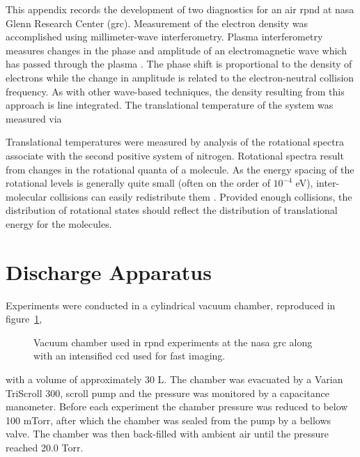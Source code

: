 This appendix records the development of two diagnostics for an air \acs{rpnd}
at \acs{nasa} Glenn Research Center (\acs{grc}). Measurement of the electron
density was accomplished using millimeter-wave interferometry. Plasma
interferometry measures changes in the phase and amplitude of an electromagnetic
wave which has passed through the plasma \cite{Lieberman2005}. The phase shift
is proportional to the density of electrons while the change in amplitude is
related to the electron-neutral collision frequency. As with other wave-based
techniques, the density resulting from this approach is line integrated. The
translational temperature of the system was measured via

Translational temperatures were measured by analysis of the rotational spectra
associate with the second positive system of nitrogen. Rotational spectra result
from changes in the rotational quanta of a molecule. As the energy spacing of
the rotational levels is generally quite small (often on the order of $10^{-4}$
eV), inter-molecular collisions can easily redistribute them
\cite{Herzberg1950}. Provided enough collisions, the distribution of rotational
states should reflect the distribution of translational energy for the
molecules.

\section{Discharge Apparatus}

Experiments were conducted in a cylindrical vacuum chamber, reproduced in
figure~\ref{fig:nasachamber},
\begin{figure}
  \centering
  \setlength\fboxsep{0pt}
  \setlength\fboxrule{1.0pt}
  \caption{Vacuum chamber used in \acs{rpnd} experiments at the \acs{nasa}
    \acs{grc} along with an intensified \acs{ccd} used for fast imaging.}
  \label{fig:nasachamber}
\end{figure}
with a volume of approximately 30 L. The chamber was evacuated by a Varian
TriScroll 300, scroll pump and the pressure was monitored by a capacitance
manometer. Before each experiment the chamber pressure was reduced to below 100
mTorr, after which the chamber was sealed from the pump by a bellows valve. The
chamber was then back-filled with ambient air until the pressure reached 20.0
Torr.

